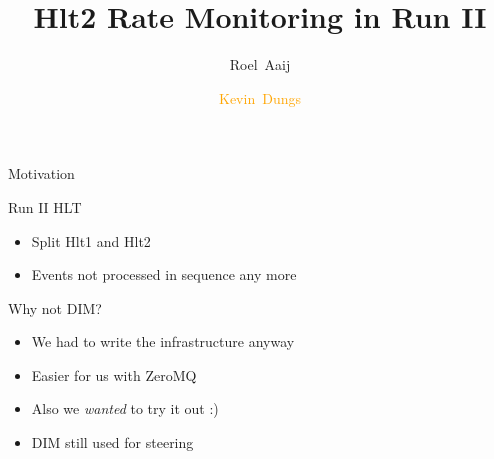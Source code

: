 \documentclass[aspectratio=1610,compress,titleprogressbar]{beamer}
\title{Hlt2 Rate Monitoring in Run II}
\author[K.~Dungs]{Roel~Aaij\inst{1} \and \textcolor{orange}{Kevin~Dungs\inst{2}}}
\institute{\inst{1} CERN \and \inst{2} TU Dortmund}
\begin{document}
\maketitle

\begin{frame}{Motivation}
  \begin{block}{Run II HLT}
    \begin{itemize}
      \item Split Hlt1 and Hlt2
      \item Events not processed in sequence any more
    \end{itemize}
  \end{block}
  \begin{block}{Why not DIM?}
    \begin{itemize}
      \item We had to write the infrastructure anyway
      \item Easier for us with ZeroMQ
      \item Also we \emph{wanted} to try it out :)
      \item DIM still used for steering
    \end{itemize}
  \end{block}
\end{frame}
\end{document}
